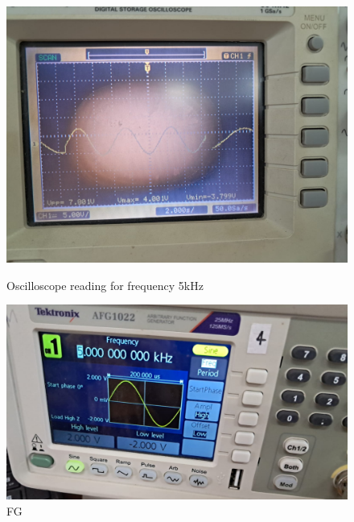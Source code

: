 \documentclass[a4paper,12pt]{article}
\begin{document}
\begin{figure}[H]
    \centering
    \begin{minipage}[b]{0.45\textwidth}
        \centering
        \includegraphics[width=\textwidth]{fig/bp/5ko.jpeg}
        \caption{Oscilloscope reading for frequency 5kHz}
    \end{minipage}
    \hfill
    \begin{minipage}[b]{0.45\textwidth}
        \centering
        \includegraphics[width=\textwidth]{fig/bp/5k.jpeg}
        \caption{FG}
    \end{minipage}
\end{figure}
\end{document}
